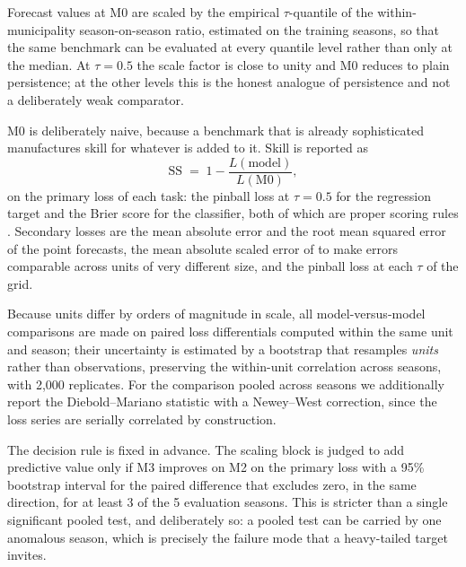 \documentclass[english,10pt,b5paper]{article}
\begin{document}
Forecast values at M0 are scaled by the empirical $\tau$-quantile of the
within-municipality season-on-season ratio, estimated on the training seasons,
so that the same benchmark can be evaluated at every quantile level rather
than only at the median. At $\tau=0.5$ the scale factor is close to unity and
M0 reduces to plain persistence; at the other levels this is the honest
analogue of persistence and not a deliberately weak comparator.

M0 is deliberately naive, because a benchmark that is already sophisticated
manufactures skill for whatever is added to it. Skill is reported as
%
\begin{equation}
\mathrm{SS} \;=\; 1-\frac{L(\text{model})}{L(\mathrm{M0})},
\label{eq:skill}
\end{equation}
%
on the primary loss of each task: the pinball loss at $\tau=0.5$ for the
regression target and the Brier score for the classifier, both of which are proper
scoring rules \citep{gneiting2007strictly}. Secondary losses are the mean absolute
error and the root mean squared error of the point forecasts, the mean absolute
scaled error of \citet{hyndman2006another} to make errors comparable across units
of very different size, and the pinball loss at each $\tau$ of the grid.

Because units differ by orders of magnitude in scale, all model-versus-model
comparisons are made on paired loss differentials computed within the same unit
and season; their uncertainty is estimated by a bootstrap that resamples
\emph{units} rather than observations, preserving the within-unit correlation
across seasons, with 2{,}000 replicates. For the comparison pooled across seasons
we additionally report the Diebold--Mariano statistic \citep{diebold1995comparing}
with a Newey--West correction, since the loss series are serially correlated by
construction.

The decision rule is fixed in advance. The scaling block is judged to add
predictive value only if M3 improves on M2 on the primary loss with a 95\%
bootstrap interval for the paired difference that excludes zero, in the same
direction, for at least 3 of the 5 evaluation seasons. This is stricter than
a single significant pooled test, and deliberately so: a pooled test can be
carried by one anomalous season, which is precisely the failure mode that a
heavy-tailed target invites.
\end{document}
